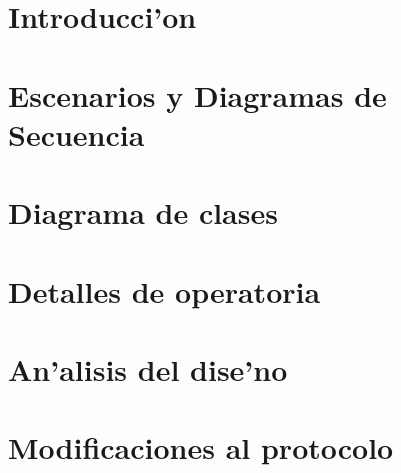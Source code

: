 \documentclass[spanish, a4paper, 10pt, titlepage]{article}
\author{Echevarr'ia - Farjat - Freijo - Giusto}
\begin{document}

\tableofcontents
\clearpage



\section{Introducci'on}

\clearpage
 
\section{Escenarios y Diagramas de Secuencia}

\clearpage

% 

\section{Diagrama de clases}

\clearpage

\section{Detalles de operatoria}

\clearpage

\section{An'alisis del dise'no}

\clearpage

\section{Modificaciones al protocolo}\label{Seccion::ModificacionesAlProtocolo}

\clearpage
\end{document}
